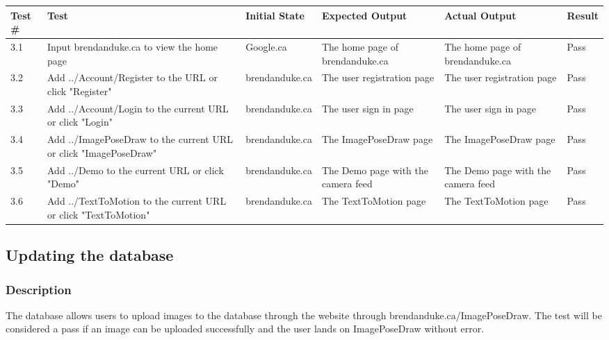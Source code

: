 \documentclass{scrreprt}
\begin{document}
\begin{table}[H]
        \centering
        \begin{tabular}[t]{||p{0.75cm}|p{4cm}|p{2.5cm}|p{3cm}|p{2.5cm}|p{1cm}||}
                \hline
                \textbf Test \# & \textbf Test & \textbf Initial State & \textbf Expected Output & \textbf Actual Output & \textbf Result\\
                \hline\hline
                3.1 & Input brendanduke.ca to view the home page & Google.ca & The home page of brendanduke.ca & The home page of brendanduke.ca & Pass \\
                \hline
                3.2 & Add ../Account/Register to the URL or click "Register" & brendanduke.ca & The user registration page & The user registration page & Pass \\
                \hline
                3.3 & Add ../Account/Login to the current URL or click "Login" & brendanduke.ca & The user sign in page & The user sign in page & Pass \\
                \hline
                3.4 & Add ../ImagePoseDraw to the current URL or click "ImagePoseDraw" & brendanduke.ca & The ImagePoseDraw page & The ImagePoseDraw page & Pass \\
                \hline
                3.5 &  Add ../Demo to the current URL or click "Demo" & brendanduke.ca & The Demo page with the camera feed & The Demo page with the camera feed & Pass \\
                \hline
                3.6 &  Add ../TextToMotion to the current URL or click "TextToMotion" & brendanduke.ca & The TextToMotion page & The TextToMotion page & Pass \\
                \hline
        \end{tabular}
\end{table}

\subsection{Updating the database}
\subsubsection{Description}

The database allows users to upload images to the database through the website through brendanduke.ca/ImagePoseDraw. The test will be considered a pass if an image can be uploaded successfully and the user lands on ImagePoseDraw without error.
\end{document}
